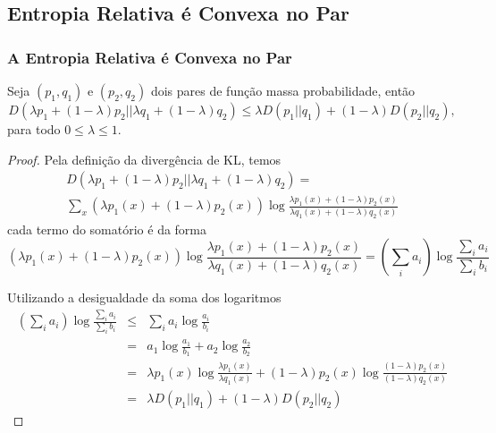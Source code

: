 \subsection{Entropia Relativa é Convexa no Par}
\begin{frame}[allowframebreaks]
  \frametitle{A Entropia Relativa é Convexa no Par}
  \begin{theorem}
  Seja $(p_1, q_1)$ e $(p_2, q_2)$ dois pares de função massa probabilidade, então
    \begin{equation}
        D(\lambda p_1 + (1 - \lambda) p_2 || \lambda q_1 + (1- \lambda)q_2) \leq \lambda D(p_1 || q_1) + (1- \lambda) D(p_2 || q_2) ,
    \end{equation}
    para todo $0 \leq \lambda \leq 1$.
  \end{theorem}

  \framebreak

  \begin{proof}
  Pela definição da divergência de KL, temos
    \begin{multline}
    D(\lambda p_1 + (1 - \lambda) p_2 || \lambda q_1 + (1- \lambda)q_2) = \\
        \sum_x (\lambda p_1(x) + (1 - \lambda) p_2(x) ) \log \frac{\lambda p_1(x) + (1 - \lambda) p_2(x)}{\lambda q_1(x) + (1 - \lambda) q_2(x)}
    \end{multline}
    cada termo do somatório é da forma
    \begin{equation}
        ( \lambda p_1(x) + (1 - \lambda) p_2(x) ) \log \frac{\lambda p_1(x) + (1 - \lambda) p_2(x)}{\lambda q_1(x) + (1 - \lambda) q_2(x)} = \left( \sum_i a_i \right) \log \frac{\sum_i a_i}{\sum_i b_i}
    \end{equation}

  \proofbreak

  Utilizando a desigualdade da soma dos logaritmos 
  \begin{eqnarray}
  \left( \sum_i a_i \right) \log \frac{\sum_i a_i}{\sum_i b_i} &\leq&
        \sum_i a_i \log \frac{a_i}{b_i} \nonumber \\
        &=& a_1 \log \frac{a_1}{b_1} + a_2 \log \frac{a_2}{b_2} \nonumber \\
        &=& \lambda p_1(x) \log \frac{\lambda p_1(x)}{\lambda q_1(x)} + (1 - \lambda) p_2(x) \log \frac{(1 - \lambda) p_2(x)}{(1-\lambda) q_2(x)} \nonumber \\
        &=& \lambda D(p_1 || q_1) + (1 - \lambda) D(p_2 || q_2)
  \end{eqnarray}
  \end{proof}
\end{frame}

